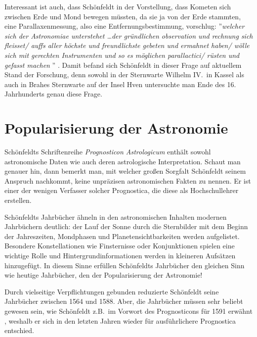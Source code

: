 \documentclass[12pt]{article}
\begin{document}
Interessant ist auch, dass Schönfeldt in der Vorstellung, dass Kometen sich zwischen Erde und Mond bewegen müssten, da sie ja von der Erde stammten, eine Parallaxenmessung, also eine Entfernungsbestimmung, vorschlug: ''\emph{welcher sich der Astronomiae unterstehet \ldots der gründlichen observation und rechnung sich fleisset/ auffs aller höchste und freundlichste gebeten und ermahnet haben/ wölle sich mit gerechten Instrumenten und so es möglichen parallactici/ rüsten und gefasst machen }'' \cite{Schoenfeldt1558}. Damit befand sich Schönfeldt in dieser Frage auf aktuellem Stand der Forschung, denn sowohl in der Sternwarte Wilhelm IV.\ in Kassel als auch in Brahes Sternwarte auf der Insel Hven untersuchte man Ende des 16. Jahrhunderts genau diese Frage.


\section{Popularisierung der Astronomie}

Schönfeldts Schriftenreihe \emph{Prognosticon Astrologicum} enthält sowohl astronomische Daten wie auch deren astrologische Interpretation. Schaut man genauer hin, dann bemerkt man, mit welcher großen Sorgfalt Schönfeldt seinem Anspruch nachkommt, keine unpräzisen astronomischen Fakten zu nennen. Er ist einer der wenigen Verfasser solcher Prognostica, die diese als Hochschullehrer erstellen.

Schönfeldts Jahrbücher ähneln in den astronomischen Inhalten modernen Jahrbüchern deutlich: der Lauf der Sonne durch die Sternbilder mit dem Beginn der Jahreszeiten, Mondphasen und Planetensichtbarkeiten werden aufgelistet. Besondere Konstellationen wie Finsternisse oder Konjunktionen spielen eine wichtige Rolle und Hintergrundinformationen werden in kleineren Aufsätzen hinzugefügt. In diesem Sinne erfüllen Schönfeldts Jahrbücher den gleichen Sinn wie heutige Jahrbücher, den der Popularisierung der Astronomie!

Durch vielseitige Verpflichtungen gebunden reduzierte Schönfeldt seine Jahrbücher zwischen 1564 und 1588. Aber, die Jahrbücher müssen sehr beliebt gewesen sein, wie Schönfeldt z.B.\ im Vorwort des Prognosticons für 1591 erwähnt \cite{Schoenfeldt1591a}, weshalb er sich in den letzten Jahren wieder für ausführlichere Prognostica entschied.
\end{document}
